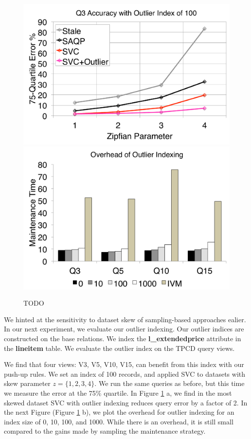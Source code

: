 \begin{figure}[t]
\centering
 \includegraphics[scale=0.14]{exp/msoi_1.pdf}
 \includegraphics[scale=0.14]{exp/msoi_2.pdf}

 \caption{TODO \label{exp5-oi}}
\end{figure}
We hinted at the sensitivity to dataset skew of sampling-based approaches ealier.
In our next experiment, we evaluate our outlier indexing.
Our outlier indices are constructed on the base relations.
We index the \textbf{l\_extendedprice} attribute in the \textbf{lineitem} table.
We evaluate the outlier index on the TPCD query views.

We find that four views: V3, V5, V10, V15, can benefit from this index with our push-up rules.
We set an index of 100 records, and applied SVC to datasets with skew parameter $z=\{1,2,3,4\}$. 
We run the same queries as before, but this time we measure the error at the 75\% quartile.
In Figure \ref{exp5-oi} a, we find in the most skewed dataset SVC with outlier indexing reduces query error by a factor of 2.
In the next Figure (Figure \ref{exp5-oi} b), we plot the overhead for outlier indexing for an index size of 0, 10, 100, and 1000.
While there is an overhead, it is still small compared to the gains made by sampling the maintenance strategy.

